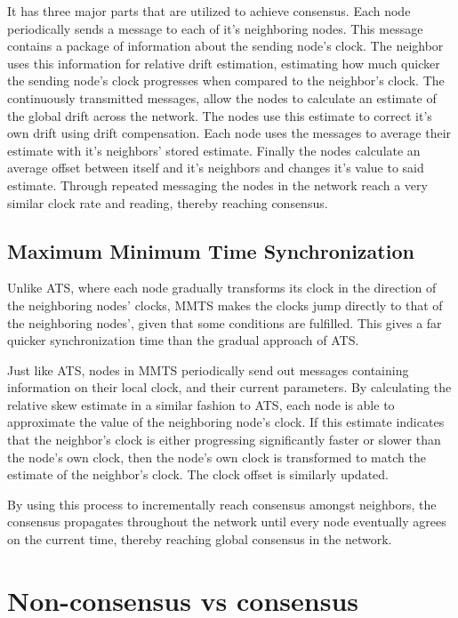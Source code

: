 \documentclass[a0,24pt]{sciposter}
\begin{document}
\begin{multicols}{2}
It has three major parts that are utilized to achieve consensus. Each node periodically sends a message to each of it's neighboring nodes. This message contains a package of information about the sending node's clock. The neighbor uses this information for relative drift estimation, estimating how much quicker the sending node's clock progresses when compared to the neighbor's clock. The continuously transmitted messages, allow the nodes to calculate an estimate of the global drift across the network. The nodes use this estimate to correct it's own drift using drift compensation. Each node uses the messages to average their estimate with it's neighbors' stored estimate. Finally the nodes calculate an average offset between itself and it's neighbors and changes it's value to said estimate. Through repeated messaging the nodes in the network reach a very similar clock rate and reading, thereby reaching consensus.

\subsection{Maximum Minimum Time Synchronization}
Unlike ATS, where each node gradually transforms its clock in the direction of the neighboring nodes' clocks, MMTS makes the clocks jump directly to that of the neighboring nodes', given that some conditions are fulfilled. This gives a far quicker synchronization time than the gradual approach of ATS.

Just like ATS, nodes in MMTS periodically send out messages containing information on their local clock, and their current parameters. By calculating the relative skew estimate in a similar fashion to ATS, each node is able to approximate the value of the neighboring node's clock. If this estimate indicates that the neighbor's clock is either progressing significantly faster or slower than the node's own clock, then the node's own clock is transformed to match the estimate of the neighbor's clock. The clock offset is similarly updated.

By using this process to incrementally reach consensus amongst neighbors, the consensus propagates throughout the network until every node eventually agrees on the current time, thereby reaching global consensus in the network.

\section{Non-consensus vs consensus}


\end{multicols}
\end{document}
